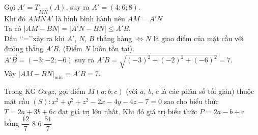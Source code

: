 \begin{ex}
{		Gọi $A'={T_{\overrightarrow{MN}}}(A)$, suy ra $A'=(4;6;8)$.\\
		Khi đó $AMNA'$ là hình bình hành nên $AM=A'N$\\
		Ta có $\left|AM-BN\right|=\left|A'N-BN\right|\le A'B$.\\
		Dấu \lq\lq =\rq\rq xảy ra khi $A'$, $N$, $B$ thẳng hàng $\Leftrightarrow N$ là giao điểm của mặt cầu với đường thẳng $A'B$. (Điểm $N$ luôn tồn tại).\\
		$\overrightarrow{A'B}=(-3;-2;-6)$ suy ra $A'B=\sqrt{(-3)^2+(-2)^2+(-6)^2}=7$.\\
		Vậy ${{\left|AM-BN\right|}_{\min}}=A'B=7$.}
\end{ex}
\begin{ex}%
	Trong KG $Oxyz$, gọi điểm $M(a;b;c)$ (với $a$, $b$, $c$ là các phân số tối giản) thuộc mặt cầu $(S)\colon x^2+y^2+z^2-2x-4y-4z-7=0$ sao cho biểu thức $T=2a+3b+6c$ đạt giá trị lớn nhất. Khi đó giá trị biểu thức $P=2a-b+c$ bằng
	\choice
	{$\dfrac{12}{7}$}
	{$8$}
	{\True $6$}
	{$\dfrac{51}{7}$}
\end{ex}
